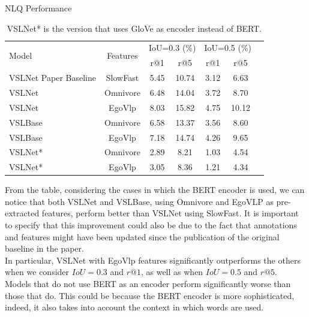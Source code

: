 \documentclass[conference]{IEEEtran}
\begin{document}
\begin{table}[h]
\centering
\caption{NLQ Performance}
\label{tab:performance}
\begin{tabular}{@{}lcccccc@{}}
\toprule
\multirow{2}{*}{Model} & \multirow{2}{*}{Features} & \multicolumn{2}{c}{IoU=0.3 (\%)} & \multicolumn{2}{c}{IoU=0.5 (\%)} \\ 
& & r@1  & r@5 & r@1   & r@5       \\ \midrule
VSLNet Paper Baseline & SlowFast & 5.45 & 10.74 & 3.12 & 6.63 \\ 
VSLNet & Omnivore & 6.48 & 14.04 & 3.72 & 8.70 \\ 
VSLNet & EgoVlp & 8.03 & 15.82 & 4.75 & 10.12 \\ 
VSLBase & Omnivore & 6.58 & 13.37 & 3.56 & 8.60 \\
VSLBase & EgoVlp & 7.18 & 14.74 & 4.26 & 9.65 \\
VSLNet* & Omnivore & 2.89 & 8.21 & 1.03 & 4.54 \\
VSLNet* & EgoVlp & 3.05 & 8.36 & 1.21 & 4.34 \\
\bottomrule
\end{tabular}
\captionsetup{font=footnotesize}
\caption*{VSLNet* is the version that uses GloVe as encoder instead of BERT.}
\end{table}
From the table, considering the cases in which the BERT encoder is used, we can notice that both VSLNet and VSLBase, using Omnivore and EgoVLP as pre-extracted features, perform better than VSLNet using SlowFast. It is important to specify that this improvement could also be due to the fact that annotations and features might have been updated since the publication of the original baseline in the paper.
\\
In particular, VSLNet with EgoVlp features significantly outperforms the others when we consider $IoU = 0.3$ and $r@1$, as well as when $IoU = 0.5$ and $r@5$.
\\
Models that do not use BERT as an encoder perform significantly worse than those that do. This could be because the BERT encoder is more sophisticated, indeed, it also takes into account the context in which words are used.
\end{document}
